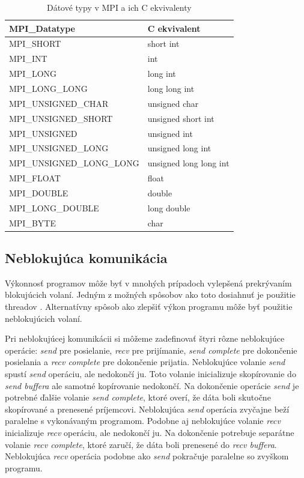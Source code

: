 \begin{table}[!h]
\centering
\begin{tabular}{@{}ll@{}}
\toprule
\textbf{MPI\_Datatype}    & \textbf{C ekvivalent}  \\ \midrule
MPI\_SHORT                & short int              \\
MPI\_INT                  & int                    \\
MPI\_LONG                 & long int               \\
MPI\_LONG\_LONG           & long long int          \\
MPI\_UNSIGNED\_CHAR       & unsigned char          \\
MPI\_UNSIGNED\_SHORT      & unsigned short int     \\
MPI\_UNSIGNED             & unsigned int           \\
MPI\_UNSIGNED\_LONG       & unsigned long int      \\
MPI\_UNSIGNED\_LONG\_LONG & unsigned long long int \\
MPI\_FLOAT                & float                  \\
MPI\_DOUBLE               & double                 \\
MPI\_LONG\_DOUBLE         & long double            \\
MPI\_BYTE                 & char                   \\ \bottomrule
\end{tabular}
\caption{Dátové typy v MPI a ich C ekvivalenty}
\label{tab:mpi-datatypes}
\end{table}

\subsection{Neblokujúca komunikácia}
Výkonnosť programov môže byť v mnohých prípadoch vylepšená prekrývaním blokujúcich volaní.
Jedným z možných spôsobov ako toto dosiahnuť je použitie threadov .
Alternatívny spôsob ako zlepšiť výkon programu môže byť použitie neblokujúcich volaní. \cite{mpi3-1}

Pri neblokujúcej komunikácii si môžeme zadefinovať štyri rôzne neblokujúce operácie: \textit{send} pre posielanie,
\textit{recv} pre prijímanie, \textit{send complete} pre dokončenie posielania a \textit{recv complete} pre dokončenie prijatia.
Neblokujúce volanie \textit{send} spustí \textit{send} operáciu, ale nedokončí ju.
Toto volanie inicializuje skopírovanie do \textit{send buffera} ale samotné kopírovanie nedokončí.
Na dokončenie operácie \textit{send} je potrebné ďalšie volanie \textit{send complete},
ktoré overí, že dáta boli skutočne skopírované a prenesené príjemcovi.
Neblokujúca \textit{send} operácia zvyčajne beží paralelne s vykonávaným programom.
Podobne aj neblokujúce volanie \textit{recv} inicializuje \textit{recv} operáciu, ale nedokončí ju. Na dokončenie potrebuje separátne volanie \textit{recv complete},
ktoré zaručí, že dáta boli prenesené do \textit{recv buffera}. Neblokujúca \textit{recv} operácia podobne ako \textit{send} pokračuje paralelne so zvyškom programu.

